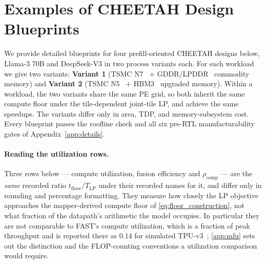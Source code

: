 \section{Examples of CHEETAH Design Blueprints}\label{app:blueprints}


We provide detailed blueprints for four prefill-oriented CHEETAH designs below, Llama-3 70B and DeepSeek-V3 in two process variants each.
For each workload we give two variants: \textbf{Variant 1} (TSMC N7~\citep{wu2016iedm7nm,chang2017sram7nm,tsmc_logic_technology,europractice_tsmc7} + GDDR/LPDDR~\citep{micron2020gddr6x,jedec2021lpddr5x} commodity memory) and \textbf{Variant 2} (TSMC N5~\citep{yeap2019iedm5nm,wikichip2020tsmc5nm,tsmc_logic_technology} + HBM3~\citep{jedec2022hbm3} upgraded memory).
Within a workload, the two variants share the same PE grid, so both inherit the same compute floor under the tile-dependent joint-tile LP, and achieve the same speedups.
The variants differ only in area, TDP, and memory-subsystem cost.
Every blueprint passes the roofline check and all six pre-RTL manufacturability gates of Appendix~\ref{app:details}.

\paragraph{Reading the utilization rows.}
Three rows below --- compute utilization, fusion efficiency and $\rho_{\mathrm{comp}}$ --- are the \emph{same} recorded ratio $t_{\mathrm{floor}}/T_{\mathrm{LP}}$ under their recorded names for it, and differ only in rounding and percentage formatting.
They measure how closely the LP objective approaches the mapper-derived compute floor of \cref{eq:floor_construction}, not what fraction of the datapath's arithmetic the model occupies.
In particular they are not comparable to FAST's compute utilization, which is a fraction of peak throughput and is reported there as $0.14$ for simulated TPU-v3~\citep{zhang_fast}; \cref{app:mfu} sets out the distinction and the FLOP-counting conventions a utilization comparison would require.

